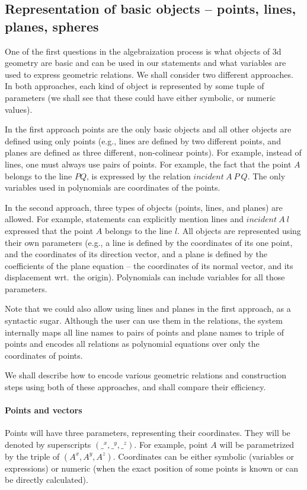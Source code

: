 \documentclass[final,1p,times,authoryear]{elsarticle}
\begin{document}
\subsection{Representation of basic objects -- points, lines, planes, spheres}
One of the first questions in the algebraization process is what
objects of 3d geometry are basic and can be used in our statements and
what variables are used to express geometric relations. We shall
consider two different approaches. In both approaches, each kind of
object is represented by some tuple of parameters (we shall see that
these could have either symbolic, or numeric values).

In the first approach points are the only basic objects and all other
objects are defined using only points (e.g., lines are defined by two
different points, and planes are defined as three different,
non-colinear points). For example, instead of lines, one must always
use pairs of points. For example, the fact that the point $A$ belongs
to the line $PQ$, is expressed by the relation $incident\ A\ P\ Q$.
The only variables used in polynomials are coordinates of the points.

In the second approach, three types of objects (points, lines, and
planes) are allowed. For example, statements can explicitly mention
lines and $incident\ A\ l$ expressed that the point $A$ belongs to the
line $l$. All objects are represented using their own parameters
(e.g., a line is defined by the coordinates of its one point, and the
coordinates of its direction vector, and a plane is defined by the
coefficients of the plane equation -- the coordinates of its normal
vector, and its displacement wrt.~the origin). Polynomials can include
variables for all those parameters.

Note that we could also allow using lines and planes in the first
approach, as a syntactic sugar. Although the user can use them in the
relations, the system internally maps all line names to pairs of
points and plane names to triple of points and encodes all relations
as polynomial equations over only the coordinates of points.

We shall describe how to encode various geometric relations and
construction steps using both of these approaches, and shall compare
their efficiency.

\paragraph{Points and vectors}
Points will have three parameters, representing their
coordinates. They will be denoted by superscripts $({\_}^x, {\_}^y,
{\_}^z)$. For example, point $A$ will be parametrized by the triple of
$(A^x, A^y, A^z)$. Coordinates can be either symbolic (variables or
expressions) or numeric (when the exact position of some points is
known or can be directly calculated).
\end{document}
